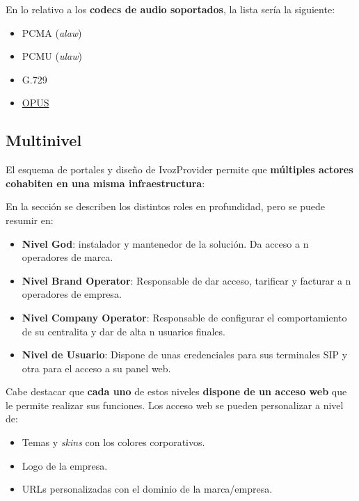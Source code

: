 \documentclass[letterpaper,10pt,spanish]{sphinxmanual}
\begin{document}
En lo relativo a los \textbf{codecs de audio soportados}, la lista sería la siguiente:
\begin{itemize}
\item {} 
PCMA (\emph{alaw})

\item {} 
PCMU (\emph{ulaw})

\item {} 
G.729

\item {} 
\href{http://opus-codec.org/}{OPUS}

\end{itemize}


\subsection{Multinivel}
\label{intro/what_is_ivozprovider:multinivel}\label{intro/what_is_ivozprovider:multilevel}
El esquema de portales y diseño de IvozProvider permite que \textbf{múltiples actores cohabiten en una misma infraestructura}:

\noindent{}

En la sección {\hyperref[operation_roles/index:operation\string-roles]{}} se describen los distintos roles en profundidad, pero se puede resumir en:
\begin{itemize}
\item {} 
\textbf{Nivel God}: instalador y mantenedor de la solución. Da acceso a n operadores de marca.

\item {} 
\textbf{Nivel Brand Operator}: Responsable de dar acceso, tarificar y facturar a n operadores de empresa.

\item {} 
\textbf{Nivel Company Operator}: Responsable de configurar el comportamiento de su centralita y dar de alta n usuarios finales.

\item {} 
\textbf{Nivel de Usuario}: Dispone de unas credenciales para sus terminales SIP y otra para el acceso a su panel web.

\end{itemize}

Cabe destacar que \textbf{cada uno} de estos niveles \textbf{dispone de un acceso web} que le permite realizar sus funciones. Los acceso web se pueden personalizar a nivel de:
\begin{itemize}
\item {} 
Temas y \emph{skins} con los colores corporativos.

\item {} 
Logo de la empresa.

\item {} 
URLs personalizadas con el dominio de la marca/empresa.

\end{itemize}
\end{document}
